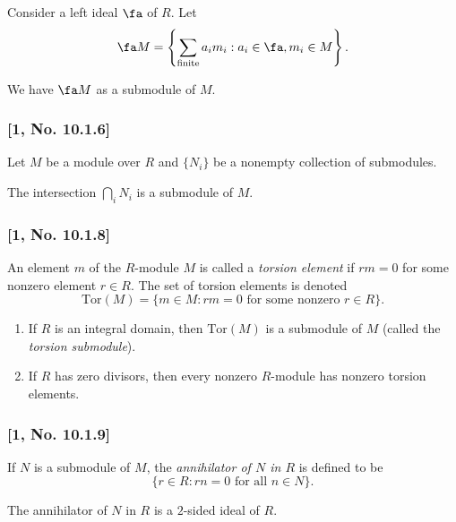 \documentclass[11pt]{amsart}
\begin{document}
\gvn Consider a left ideal \(\fa\) of \(R\). Let
\[\fa M = \left\{\sum_\text{finite} a_i m_i : a_i \in \fa, m_i \in M\right\}.\]

\wts We have \(\fa M\) as a submodule of \(M\).

\subsubsection{\texorpdfstring{{[}1, No.
10.1.6{]}}{, number 10.1.6{[}1, No. 10.1.6{]}}}

\gvn Let \(M\) be a module over \(R\) and \(\{N_i\}\) be a nonempty
collection of submodules.

\wts The intersection \(\bigcap_i N_i\) is a submodule of \(M\).

\subsubsection{\texorpdfstring{{[}1, No.
10.1.8{]}}{, number 10.1.8{[}1, No. 10.1.8{]}}}

\newcommand{\Tor}[1]{\mathrm{Tor}\left( #1 \right)}

\gvn An element \(m\) of the \(R\)-module \(M\) is called a
\emph{torsion element} if \(rm = 0\) for some nonzero element
\(r \in R\). The set of torsion elements is denoted
\[\mathrm{Tor}\left( M \right) = \{ m \in M : rm = 0 \text{ for some nonzero } r \in R\}.\]

\wts

\begin{enumerate}
\def\labelenumi{\alph{enumi}.}
\item
  If \(R\) is an integral domain, then \(\mathrm{Tor}\left( M \right)\)
  is a submodule of \(M\) (called the \emph{torsion submodule}).
\item
  If \(R\) has zero divisors, then every nonzero \(R\)-module has
  nonzero torsion elements.
\end{enumerate}

\subsubsection{\texorpdfstring{{[}1, No.
10.1.9{]}}{, number 10.1.9{[}1, No. 10.1.9{]}}}

\gvn If \(N\) is a submodule of \(M\), the \emph{annihilator of \(N\) in
\(R\)} is defined to be
\[\{r \in R : rn = 0 \text{ for all } n \in N\}.\]

\wts The annihilator of \(N\) in \(R\) is a \(2\)-sided ideal of \(R\).
\end{document}
